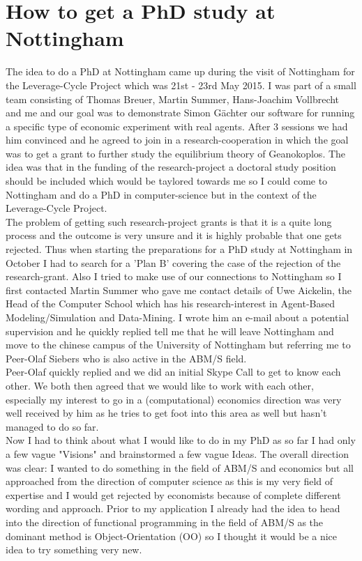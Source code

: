\section{How to get a PhD study at Nottingham}
\label{app:studentship}

The idea to do a PhD at Nottingham came up during the visit of Nottingham for the Leverage-Cycle Project which was 21st - 23rd May 2015. I was part of a small team consisting of Thomas Breuer, Martin Summer, Hans-Joachim Vollbrecht and me and our goal was to demonstrate Simon Gächter our software for running a specific type of economic experiment with real agents. After 3 sessions we had him convinced and he agreed to join in a research-cooperation in which the goal was to get a grant to further study the equilibrium theory of Geanokoplos. The idea was that in the funding of the research-project a doctoral study position should be included which would be taylored towards me so I could come to Nottingham and do a PhD in computer-science but in the context of the Leverage-Cycle Project. \\
The problem of getting such research-project grants is that it is a quite long process and the outcome is very unsure and it is highly probable that one gets rejected. Thus when starting the preparations for a PhD study at Nottingham in October I had to search for a 'Plan B' covering the case of the rejection of the research-grant. Also I tried to make use of our connections to Nottingham so I first contacted Martin Summer who gave me contact details of Uwe Aickelin, the Head of the Computer School which has his research-interest in Agent-Based Modeling/Simulation and Data-Mining. I wrote him an e-mail about a potential supervision and he quickly replied tell me that he will leave Nottingham and move to the chinese campus of the University of Nottingham but referring me to Peer-Olaf Siebers who is also active in the ABM/S field. \\
Peer-Olaf quickly replied and we did an initial Skype Call to get to know each other. We both then agreed that we would like to work with each other, especially my interest to go in a (computational) economics direction was very well received by him as he tries to get foot into this area as well but hasn't managed to do so far. \\
Now I had to think about what I would like to do in my PhD as so far I had only a few vague "Visions" and brainstormed a few vague Ideas. The overall direction was clear: I wanted to do something in the field of ABM/S and economics but all approached from the direction of computer science as this is my very field of expertise and I would get rejected by economists because of complete different wording and approach. Prior to my application I already had the idea to head into the direction of functional programming in the field of ABM/S as the dominant method is Object-Orientation (OO) so I thought it would be a nice idea to try something very new. \\
